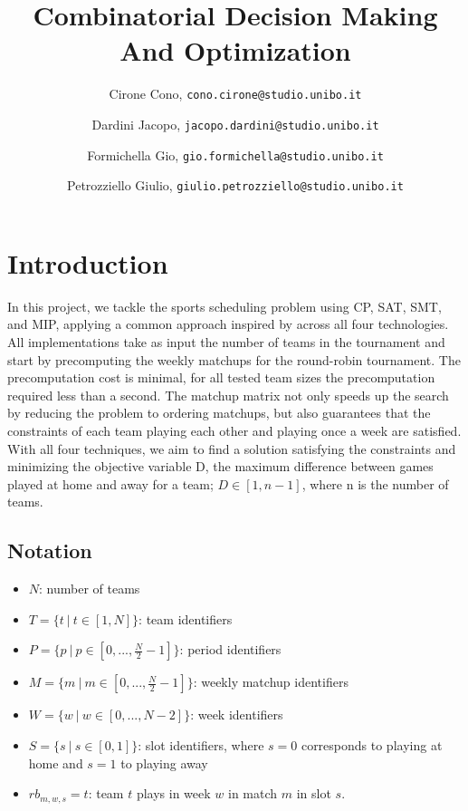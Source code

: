 \documentclass{article}
\title{Combinatorial Decision Making And Optimization}
\author{
  Cirone Cono, \texttt{cono.cirone@studio.unibo.it}
  \and
  Dardini Jacopo, \texttt{jacopo.dardini@studio.unibo.it}
  \and
  Formichella Gio, \texttt{gio.formichella@studio.unibo.it}
  \and
  Petrozziello Giulio, \texttt{giulio.petrozziello@studio.unibo.it} 
}
\date{}
\begin{document}
\maketitle


\section{Introduction}
In this project, we tackle the sports scheduling problem using CP, SAT, SMT, and MIP, applying a common approach inspired by \cite{10.1007/10704567_6} across all four technologies. All implementations take as input the number of teams in the tournament and start by precomputing the weekly matchups for the round-robin tournament. The precomputation cost is minimal, for all tested team sizes the precomputation required less than a second. The matchup matrix not only speeds up the search by reducing the problem to ordering matchups, but also guarantees that the constraints of each team playing each other and playing once a week are satisfied. With all four techniques, we aim to find a solution satisfying the constraints and minimizing the objective variable D, the maximum difference between games played at home and away for a team; $D\in [1, n-1]$, where n is the number of teams.

\subsection{Notation}
\begin{itemize}
  \item $N$: number of teams
  \item $T=\{t\ |\ t \in [1, N]\}$: team identifiers
  \item $P=\{p\ |\ p \in [0, ..., \frac{N}{2} - 1]\}$: period identifiers
  \item $M=\{m\ |\ m \in [0, ..., \frac{N}{2} - 1]\}$: weekly matchup identifiers
  \item $W=\{w\ |\ w \in [0, ..., N-2]\}$: week identifiers
  \item $S=\{s\ |\ s \in [0,1]\}$: slot identifiers, where $s=0$ corresponds to playing at home and $s=1$ to playing away
  \item $rb_{m, w, s}=t$: team $t$ plays in week $w$ in match $m$ in slot $s$.
  
\end{itemize}











\end{document}
